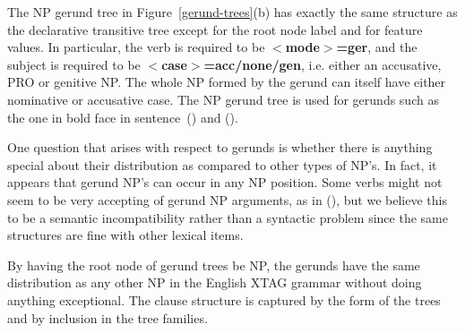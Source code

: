 The NP gerund tree in Figure~\ref{gerund-trees}(b) has exactly the same
structure as the declarative transitive tree except for the root node label and
for feature values.  In particular, the verb is required to be {\bf
$<$mode$>$=ger}, and the subject is required to be {\bf
$<$case$>$=acc/none/gen}, i.e. either an accusative, PRO or genitive NP. The
whole NP formed by the gerund can itself have either nominative or accusative
case. The NP gerund tree is used for gerunds such as the one in bold face in
sentence~() and ().

One question that arises with respect to gerunds is whether there is anything
special about their distribution as compared to other types of NP's.  In fact,
it appears that gerund NP's can occur in any NP position.  Some verbs might not
seem to be very accepting of gerund NP arguments, as in (), but we
believe this to be a semantic incompatibility rather than a syntactic problem
since the same structures are fine with other lexical items.


By having the root node of gerund trees be NP, the gerunds have the
same distribution as any other NP in the English XTAG grammar without
doing anything exceptional. The clause structure is captured by the
form of the trees and by inclusion in the tree families.

